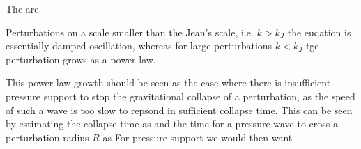 \documentclass{article}
\begin{document}
\begin{definition}
The  are
\end{definition}

Perturbations on a scale smaller than the Jean's scale, i.e. $k>k_J$ the euqation is essentially damped oscillation, whereas for large perturbations $k<k_J$ tge perturbation grows as a power law. 

\begin{idea}
This power law growth should be seen as the case where there is insufficient pressure support to stop the gravitational collapse of a perturbation, as the speed of such a wave is too slow to repsond in sufficient collapse time. This can be seen by estimating the collapse time as 
and the time for a pressure wave to cross a perturbation radius $R$ as 
For pressure support we would then want 
\end{idea}
\end{document}
